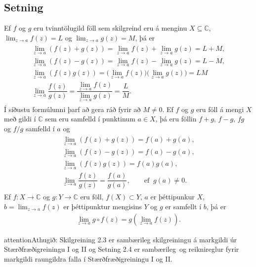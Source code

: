 \documentclass[a4paper,10pt,icelandic]{sphinxmanual}
\begin{document}
\subsection{Setning}
\label{\detokenize{Kafli02:setning}}
Ef \(f\) og \(g\) eru tvinntölugild föll sem
skilgreind eru á menginu \(X\subseteq {\mathbb{C}}\),
\(\lim_{z\to a}f(z)=L\) og \(\lim_{z\to a}g(z)=M\), þá er
\begin{equation*}
\begin{split}\begin{gathered}
\lim_{z\to a}(f(z)+g(z))=\lim_{z\to a}f(z)+\lim_{z\to a}g(z)=L+M,\\
\lim_{z\to a}(f(z)-g(z))=\lim_{z\to a}f(z)-\lim_{z\to a}g(z)=L-M,\\
\lim_{z\to a}(f(z)g(z))=\big(\lim_{z\to a}f(z)\big)\big(\lim_{z\to
a}g(z)\big)=LM\\
\lim_{z\to a}\dfrac{f(z)}{g(z)}=\dfrac{\lim_{z\to a}f(z)}{\lim_{z\to
a}g(z)}=\dfrac LM.\end{gathered}\end{split}
\end{equation*}
Í síðustu formúlunni þarf að gera ráð fyrir að \(M\neq 0\). Ef
\(f\) og \(g\) eru föll á mengi \(X\) með gildi í \({\mathbb{C}}\)
sem eru samfelld í punktinum \(a\in X\), þá eru föllin \(f+g\),
\(f-g\), \(fg\) og \(f/g\) samfelld í \(a\) og
\begin{equation*}
\begin{split}\begin{gathered}
\lim_{z\to a}(f(z)+g(z))=f(a)+g(a),\\
\lim_{z\to a}(f(z)-g(z))=f(a)-g(a),\\
\lim_{z\to a}(f(z)g(z))=f(a)g(a),\\
\lim_{z\to a}\dfrac{f(z)}{g(z)}=\dfrac{f(a)}{g(a)},
\qquad \text{ef } \ g(a)\neq 0.\end{gathered}\end{split}
\end{equation*}
Ef \(f:X\to {\mathbb{C}}\) og \(g:Y\to {\mathbb{C}}\) eru föll,
\(f(X)\subset Y\), \(a\) er þéttipunkur \(X\),
\(b=\lim_{z\to a}f(z)\) er þéttipunktur mengisins \(Y\) og
\(g\) er samfellt í \(b\), þá er
\begin{equation*}
\begin{split}\lim_{z\to a} g\circ f(z)=g(\lim_{z\to a}f(z)).\end{split}
\end{equation*}
\begin{sphinxadmonition}{attention}{Athugið:}
Skilgreining 2.3 er sambærileg skilgreiningu á markgildi úr Stærðfræðigreiningu I og II og Setning 2.4 er sambærileg og reiknireglur fyrir markgildi raungildra falla í Stærðfræðigreiningu I og II.
\end{sphinxadmonition}
\end{document}
